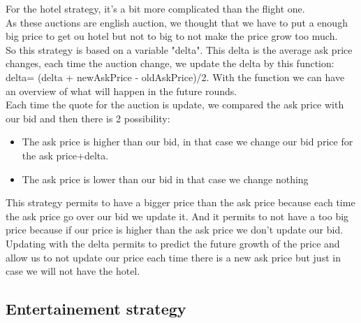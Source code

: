 For the hotel strategy, it's a bit more complicated than the flight one.\\
As these auctions are english auction, we thought that we have to put a enough big price to get ou hotel but not to big to not make the price grow too much.\\
So this strategy is based on a variable "delta". This delta is the average ask price changes, each time the auction change, we update the delta by this function: delta= (delta + newAskPrice - oldAskPrice)/2. With the function we can have an overview of what will happen in the future rounds.\\
Each time the quote for the auction is update, we compared the ask price with our bid and then there is 2 possibility:\\
\begin{itemize}
\item The ask price is higher than our bid, in that case we change our bid price for the ask price+delta.
\item The ask price is lower than our bid in that case we change nothing
\end{itemize}
This strategy permits to have a bigger price than the ask price because each time the ask price go over our bid we update it. And it permits to not have a too big price because if our price is higher than the ask price we don't update our bid.\\
Updating with the delta permits to  predict the future growth of the price and allow us to not update our price each time there is a new ask price but just in case we will not have the hotel.

\subsection{Entertainement strategy}
